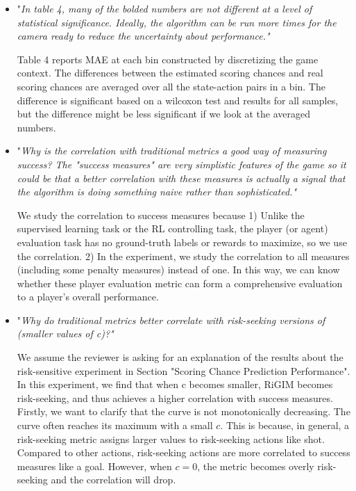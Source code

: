 \documentclass[letterpaper]{article} %
\begin{document}
\begin{itemize}
    \item "{\it In table 4, many of the bolded numbers are not different at a level of statistical significance. Ideally, the algorithm can be run more times for the camera ready to reduce the uncertainty about performance."}
    
    Table 4 reports MAE at each bin constructed by discretizing the game context. The differences between the estimated scoring chances and real scoring chances are averaged over all the state-action pairs in a bin. The difference is significant based on a wilcoxon test and results for all samples, but the difference might be less significant if we look at the averaged numbers. 
    \medskip

    \item "{\it Why is the correlation with traditional metrics a good way of measuring success? The "success measures" are very simplistic features of the game so it could be that a better correlation with these measures is actually a signal that the algorithm is doing something naive rather than sophisticated."}
    
    We study the correlation to success measures because 1) Unlike the supervised learning task or the RL controlling task, the player (or agent) evaluation task has no ground-truth labels or rewards to maximize, so we use the correlation. 2) In the experiment, we study the correlation to all measures (including some penalty measures) instead of one. In this way, we can know whether these player evaluation metric can form a comprehensive evaluation to a player's overall performance. 
    \medskip
    
    \item "{\it Why do traditional metrics better correlate with risk-seeking versions of (smaller values of c)?"}
    
    We assume the reviewer is asking for an explanation of the results about the risk-sensitive experiment in Section "Scoring Chance Prediction Performance". In this experiment, we find that when c becomes smaller, RiGIM becomes risk-seeking, and thus achieves a higher correlation with success measures. Firstly, we want to clarify that the curve is not monotonically decreasing. The curve often reaches its maximum with a small $c$. This is because, in general, a risk-seeking metric assigns larger values to risk-seeking actions like shot. Compared to other actions, risk-seeking actions are more correlated to success measures like a goal. However, when $c=0$, the metric becomes overly risk-seeking and the correlation will drop.
    \medskip
    

\end{itemize}
\end{document}
